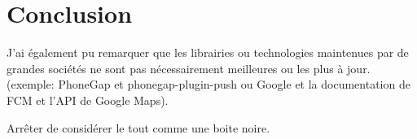 \section{Conclusion}

J'ai également pu remarquer que les librairies ou technologies maintenues par de grandes
sociétés ne sont pas nécessairement meilleures ou les plus à jour. (exemple:
PhoneGap et phonegap-plugin-push ou Google et la documentation de FCM et l'API
de Google Maps).

Arrêter de considérer le tout comme une boite noire.

\nocite{*}